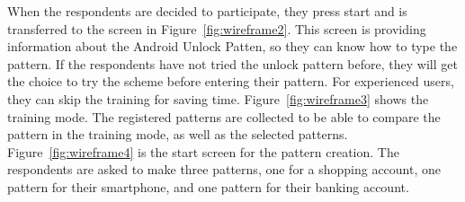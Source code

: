   When the respondents are decided to participate, they press start and is transferred to the screen in Figure~\ref{fig:wireframe2}. This screen is providing information about the Android Unlock Patten, so they can know how to type the pattern. If the respondents have not tried the unlock pattern before, they will get the choice to try the scheme before entering their pattern. For experienced users, they can skip the training for saving time. Figure~\ref{fig:wireframe3} shows the training mode. The registered patterns are collected to be able to compare the pattern in the training mode, as well as the selected patterns. Figure~\ref{fig:wireframe4} is the start screen for the pattern creation. The respondents are asked to make three patterns, one for a shopping account, one pattern for their smartphone, and one pattern for their banking account.

